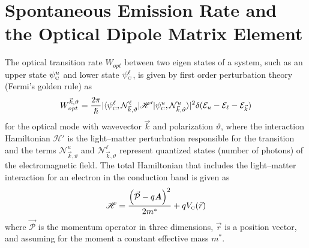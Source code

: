 {%


\section{Spontaneous Emission Rate and the Optical Dipole Matrix Element}

The optical transition rate $W_\textit{opt}$ between two eigen states of a system, such as an upper state $\psi_{\textnormal{\tiny{C}}}^u$ and lower state $\psi_{\textnormal{\tiny{C}}}^\ell$, is given by first order perturbation theory (Fermi's golden rule) as \cite{CohenTannoudji}
\begin{equation}
\label{chpt1eqn:fermi_golden_rule1}
W_\textit{opt}^{\vec{k},\vartheta} = \frac{2 \pi}{\hslash} \vert\langle \psi_\tn{\tiny{C}}^\ell,\mathcal{N}^\ell_{\vec{k},\vartheta} \vert \mathscr{H}'\vert \psi_\tn{\tiny{C}}^u,\mathcal{N}^u_{\vec{k},\vartheta}  \rangle\vert^2 \delta(\EE_u-\EE_\ell-\EE_{\vec{k}})
\end{equation}
for the optical mode with wavevector $\vec{k}$ and polarization $\vartheta$,
where the interaction Hamiltonian $\mathscr{H}'$ is the light--matter perturbation responsible for the transition and the terms $\mathcal{N}^u_{\vec{k},\vartheta}$ and $\mathcal{N}^\ell_{\vec{k},\vartheta}$ represent quantized states (number of photons) of the electromagnetic field. %
The total Hamiltonian that includes the light--matter interaction for an electron in the conduction band is given as \cite{CohenTannoudji}
\begin{equation}
\label{chpt1eqn:long-hamiltonian1}
\mathscr{H}=\frac{\left(\vec{\mathcal{P}}-q \textit{\textbf{A}}\right)^2}{2 m^*} + q V_{\textnormal{\tiny{C}}}(\vec{r})
\end{equation}
where $\vec{\mathcal{P}}$ is the momentum operator in three dimensions, $\vec{r}$ is a position vector, and assuming for the moment a constant effective mass $m^*$.
}

